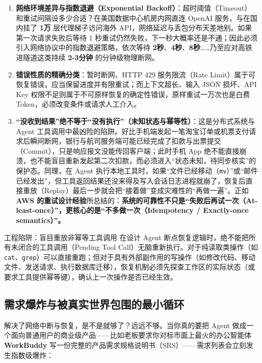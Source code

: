 \documentclass[a4paper]{article}
\begin{document}
\begin{enumerate}
    \item \textbf{网络环境差异与指数退避（Exponential Backoff）}：超时阈值（Timeout）和重试间隔设多少合适？在美国数据中心机房内网直连 OpenAI 服务，与在国内挂了 \textbf{1万} 层代理梯子访问海外 API，网络延迟与丢包分布天差地别。如果第一次请求失败后等待 1 秒重试仍然失败，下一秒大概率还是不通；因此必须引入网络协议中的指数退避策略，依次等待 \textbf{2秒}、\textbf{4秒}、\textbf{8秒}……乃至应对高铁进隧道这类持续 \textbf{2-3分钟} 的分钟级物理断网。
    \item \textbf{错误性质的精确分类}：暂时断网、HTTP 429 服务限流（Rate Limit）属于可恢复错误，应当保留进度并有限重试；而上下文超长、输入 JSON 损坏、API Key 权限不足则属于不可原样恢复的确定性错误，原样重试一万次也是白费 Token，必须改变条件或请求人工介入。
    \item \textbf{“没收到结果”绝不等于“没有执行”（未知状态与幂等性）}：这是分布式系统与 Agent 工具调用中最凶险的陷阱。好比手机端发起一笔淘宝订单或机票支付请求后瞬间断网，银行与航司服务端可能已经完成了扣款与出票提交（Commit），只是响应报文没能传回客户端；此时手机 App 绝不能直接崩溃，也不能盲目重新发起第二次扣款，而必须进入“状态未知，待同步核实”的保护态。同理，在 Agent 执行本地工具时，如果“文件已经移动（\texttt{mv}）”或“邮件已经发出”，但工具返回结果还没来得及写入会话日志进程就崩了，恢复后直接重放（Replay）最后一步就会把“接着做”变成灾难性的“再做一遍”。正如 \textbf{AWS 的重试设计经验}所总结的：\textbf{系统的可靠性不只是“失败后再试一次（At-least-once）”，更核心的是“不多做一次（Idempotency / Exactly-once semantics）”。}
\end{enumerate}

\begin{warningbox}{工程陷阱：盲目重放非幂等工具调用}
在设计 Agent 断点恢复逻辑时，绝不能把所有未闭合的工具调用（Pending Tool Call）无脑重新执行。对于纯读取类操作（如 \texttt{cat}、\texttt{grep}）可以直接重跑；但对于具有外部副作用的写操作（如修改代码、移动文件、发送请求、执行数据库迁移），恢复机制必须先探查工作区的实际状态（或要求工具提供幂等键），确认上一次操作是否已经生效。
\end{warningbox}

\subsection{需求爆炸与被真实世界包围的最小循环}

解决了网络中断与恢复，是不是就够了？远远不够。当你真的要把 Agent 做成一个面向普通用户的商业级产品——比如老板要求你对标市面上最火的办公智能体 \textbf{WorkBuddy} 写一份完整的产品需求规格说明书（SRS）——需求列表会立刻发生指数级爆炸：
\end{document}
